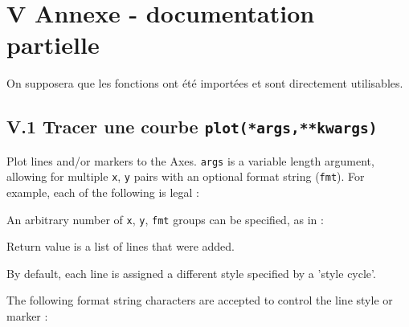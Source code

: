 \documentclass[10pt,fleqn]{article} %
\begin{document}
\ifprof
\begin{corrige}
\end{corrige}
\else
\fi

\section*{V \quad Annexe - documentation partielle}

On supposera que les fonctions ont \'et\'e import\'ees et sont directement utilisables.


\subsection*{V.1 \quad Tracer une courbe {\tt plot(*args,**kwargs)}}

Plot lines and/or markers to the Axes. {\tt args} is a variable length argument, allowing for multiple {\tt x}, {\tt y} pairs with an optional format string ({\tt fmt}). For example, each of the following is legal :


An arbitrary number of {\tt x}, {\tt y}, {\tt fmt} groups can be specified, as in :



Return value is a list of lines that were added.

By default, each line is assigned a different style specified by a 'style cycle'.

The following format string characters are accepted to control the line style or marker :
\end{document}
